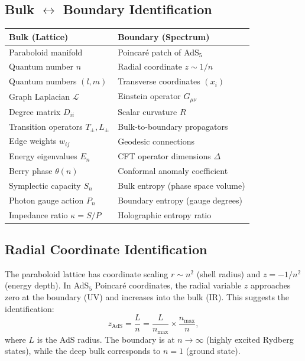 \documentclass[aps,prd,twocolumn,superscriptaddress,floatfix]{revtex4-2}
\begin{document}
\subsection{Bulk $\leftrightarrow$ Boundary Identification}

\begin{center}
\begin{tabular}{|l|l|}
\hline
\textbf{Bulk (Lattice)} & \textbf{Boundary (Spectrum)} \\
\hline
Paraboloid manifold & Poincaré patch of AdS$_5$ \\
Quantum number $n$ & Radial coordinate $z \sim 1/n$ \\
Quantum numbers $(l,m)$ & Transverse coordinates $(x_i)$ \\
Graph Laplacian $\mathcal{L}$ & Einstein operator $G_{\mu\nu}$ \\
Degree matrix $D_{ii}$ & Scalar curvature $R$ \\
Transition operators $T_\pm, L_\pm$ & Bulk-to-boundary propagators \\
Edge weights $w_{ij}$ & Geodesic connections \\
Energy eigenvalues $E_n$ & CFT operator dimensions $\Delta$ \\
Berry phase $\theta(n)$ & Conformal anomaly coefficient \\
Symplectic capacity $S_n$ & Bulk entropy (phase space volume) \\
Photon gauge action $P_n$ & Boundary entropy (gauge degrees) \\
Impedance ratio $\kappa = S/P$ & Holographic entropy ratio \\
\hline
\end{tabular}
\end{center}

\subsection{Radial Coordinate Identification}

The paraboloid lattice has coordinate scaling $r \sim n^2$ (shell radius) and $z = -1/n^2$ (energy depth). In AdS$_5$ Poincaré coordinates, the radial variable $z$ approaches zero at the boundary (UV) and increases into the bulk (IR). This suggests the identification:
\begin{equation}
z_{\text{AdS}} = \frac{L}{n} = \frac{L}{n_{\max}} \times \frac{n_{\max}}{n},
\label{eq:radial_map}
\end{equation}
where $L$ is the AdS radius. The boundary is at $n \to \infty$ (highly excited Rydberg states), while the deep bulk corresponds to $n = 1$ (ground state).
\end{document}
